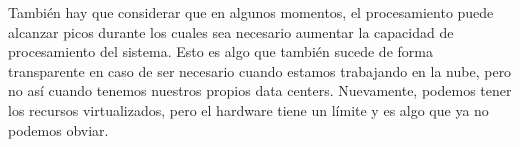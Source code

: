 \documentclass[a4paper,10pt,twoside]{article}
\begin{document}
También hay que considerar que en algunos momentos, el procesamiento puede alcanzar picos durante los cuales sea necesario aumentar la capacidad de procesamiento del sistema. Esto es algo que también sucede de forma transparente en caso de ser necesario cuando estamos trabajando en la nube, pero no así cuando tenemos nuestros propios data centers. Nuevamente, podemos tener los recursos virtualizados, pero el hardware tiene un límite y es algo que ya no podemos obviar.
\end{document}
